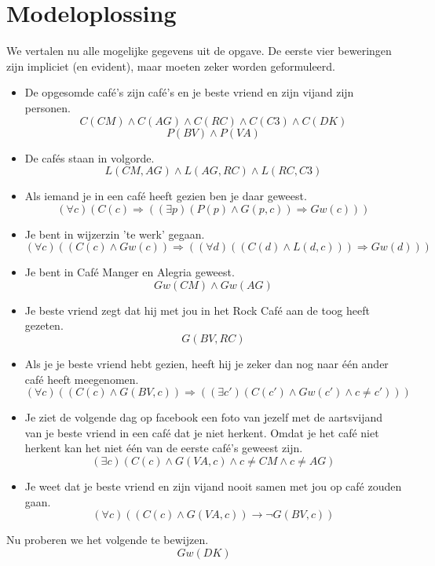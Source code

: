 \documentclass[alternative-exam.tex]{subfiles}
\begin{document}
\section{Modeloplossing}
We vertalen nu alle mogelijke gegevens uit de opgave. De eerste vier beweringen zijn impliciet (en evident), maar moeten zeker worden geformuleerd.
\begin{itemize}
\item De opgesomde caf\'e's zijn caf\'e's en je beste vriend en zijn vijand zijn personen.
\[ C(CM)\wedge C(AG)\wedge C(RC)\wedge C(C3)\wedge C(DK) \]
\[ P(BV) \wedge P(VA)\]
\item De caf\'es staan in volgorde.
\[
L(CM,AG) \wedge L(AG,RC) \wedge L(RC,C3)
\]
\item Als iemand je in een caf\'e heeft gezien ben je daar geweest.
\[
(\forall c)(C(c) \Rightarrow ((\exists p) (P(p) \wedge G(p,c)) \Rightarrow Gw(c)))
\]
\item Je bent in wijzerzin 'te werk' gegaan.
\[
(\forall c)(( C(c) \wedge Gw(c)) \Rightarrow ((\forall d)(( C(d) \wedge L(d,c)))\Rightarrow Gw(d)))
\]
\item Je bent in Caf\'e Manger en Alegria geweest.
\[
Gw(CM) \wedge Gw(AG)
\]
\item Je beste vriend zegt dat hij met jou in het Rock Caf\'e aan de toog heeft gezeten.
\[
G(BV,RC)
\]
\item Als je je beste vriend hebt gezien, heeft hij je zeker dan nog naar \'e\'en ander caf\'e heeft meegenomen.
\[
(\forall c) ((C(c) \wedge G(BV,c)) \Rightarrow ((\exists c') (C(c') \wedge Gw(c') \wedge c \neq c')))
\]
\item Je ziet de volgende dag op facebook een foto van jezelf met de aartsvijand van je beste vriend in een caf\'e dat je niet herkent. Omdat je het caf\'e niet herkent kan het niet \'e\'en van de eerste caf\'e's geweest zijn. 
\[
(\exists c) (C(c) \wedge G(VA,c) \wedge c\neq CM \wedge c \neq AG)
\]
\item Je weet dat je beste vriend en zijn vijand nooit samen met jou op caf\'e zouden gaan.
\[
(\forall c) ((C(c) \wedge G(VA,c)) \rightarrow \neg G(BV,c))
\]
\end{itemize}
Nu proberen we het volgende te bewijzen.
\[
Gw(DK)
\]
\end{document}
